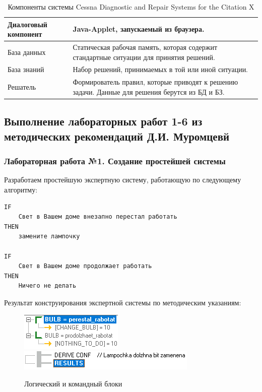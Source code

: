 \documentclass[14pt,a4paper,report]{report}
\begin{document}
\begin{table}[h!]
	\centering
	\bgroup
	\def\arraystretch{1}
	\begin{tabular}{ | P{4.8cm} | P{8.8cm} | }
		\hline
		Диалоговый компонент & Java-Applet, запускаемый из браузера. \\ \hline
		База данных & Статическая рабочая память, которая содержит стандартные ситуации для принятия решений. \\ \hline
		База знаний & Набор решений, принимаемых в той или иной ситуации. \\ \hline
		Решатель & Формирователь правил, которые приводят к решению задачи. Данные для решения берутся из БД и БЗ. \\ \hline
	\end{tabular}
	\egroup
	\caption{Компоненты системы Cessna Diagnostic and Repair Systems for the Citation X}
	\label{table:1}
\end{table}

\subsection{Выполнение лабораторных работ 1-6 из методических рекомендаций Д.И. Муромцевй}

\subsubsection{Лабораторная работа №1. Создание простейшей системы}

Разработаем простейшую экспертную систему, работающую по следующему алгоритму:

\begin{lstlisting}
IF
    Свет в Вашем доме внезапно перестал работать
THEN
    замените лампочку

IF
    Свет в Вашем доме продолжает работать
THEN
    Ничего не делать
\end{lstlisting}

Результат конструирования экспертной системы по методическим указаниям:

\begin{figure}[ht!]
	\includegraphics[width=.35\textwidth]{images/1_1.png}\hfill
	\includegraphics[width=.55\textwidth]{images/1_2.png}
	\caption{Логический и командный блоки}
\end{figure}
\end{document}
